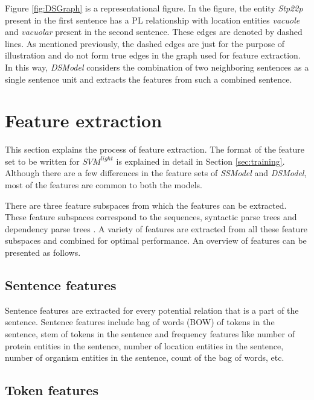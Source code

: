 Figure \ref{fig:DSGraph} is a representational figure. In the figure, the entity \textit{Stp22p} present in the first sentence has a PL relationship with location entities \textit{vacuole} and \textit{vacuolar} present in the second sentence. These edges are denoted by dashed lines. As mentioned previously, the dashed edges are just for the purpose of illustration and do not form true edges in the graph used for feature extraction. In this way, \textit{DSModel} considers the combination of two neighboring sentences as a single sentence unit and extracts the features from such a combined sentence.



\section{Feature extraction}\label{sec:featExp}

This section explains the process of feature extraction. The format of the feature set to be written for $SVM^{light}$ is explained in detail in Section \ref{sec:training}. Although there are a few differences in the feature sets of \textit{SSModel} and \textit{DSModel}, most of the features are common to both the models.

There are three feature subspaces from which the features can be extracted. These feature subspaces correspond to the sequences, syntactic parse trees and dependency parse trees \cite{jiang2007systematic}. A variety of features are extracted from all these feature subspaces and combined for optimal performance. An overview of features can be presented as follows.

\subsection*{Sentence features}

Sentence features are extracted for every potential relation that is a part of the sentence. Sentence features include bag of words (BOW) of tokens in the sentence, stem of tokens in the sentence and frequency features like number of protein entities in the sentence, number of location entities in the sentence, number of organism entities in the sentence, count of the bag of words, etc.

\subsection*{Token features}


